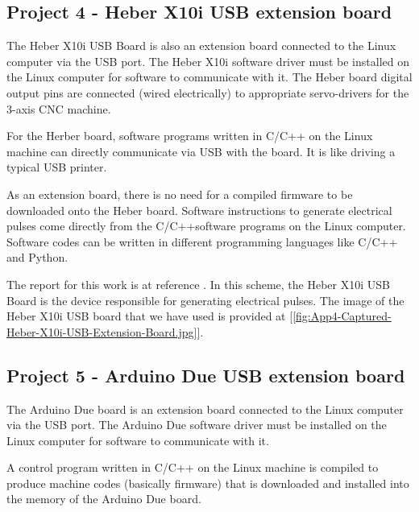 \subsection{Project 4 - Heber X10i USB extension board}

The Heber X10i USB Board is also an extension board connected to the Linux computer via the USB port. The Heber X10i software driver must be installed on the Linux computer for software to communicate with it. The Heber board digital output pins are connected (wired electrically) to appropriate servo-drivers for the 3-axis CNC machine. 
\vspace*{1\baselineskip}

For the Herber board, software programs written in C/C++ on the Linux machine can directly communicate via USB with the board. It is like driving a typical USB printer. 
\vspace*{1\baselineskip}

As an extension board, there is no need for a compiled firmware to be downloaded onto the Heber board. Software instructions to generate electrical pulses come directly from the C/C++software programs on the Linux computer. Software codes can be written in different programming languages like C/C++ and Python.
\vspace*{1\baselineskip}

The report for this work is at reference \cite{FYP_Saleh_2014}. In this scheme, the Heber X10i USB Board is the device responsible for generating electrical pulses. The image of the  Heber X10i USB board that we have used is provided at [\ref{fig:App4-Captured-Heber-X10i-USB-Extension-Board.jpg}].


\subsection{Project 5 - Arduino Due USB extension board}

The Arduino Due board is an extension board connected to the Linux computer via the USB port. The Arduino Due software driver must be installed on the Linux computer for software to communicate with it. 
\vspace*{1\baselineskip}

A control program written in C/C++ on the Linux machine is compiled to produce machine codes (basically firmware) that is downloaded and installed into the memory of the Arduino Due board. 
\vspace*{1\baselineskip}

